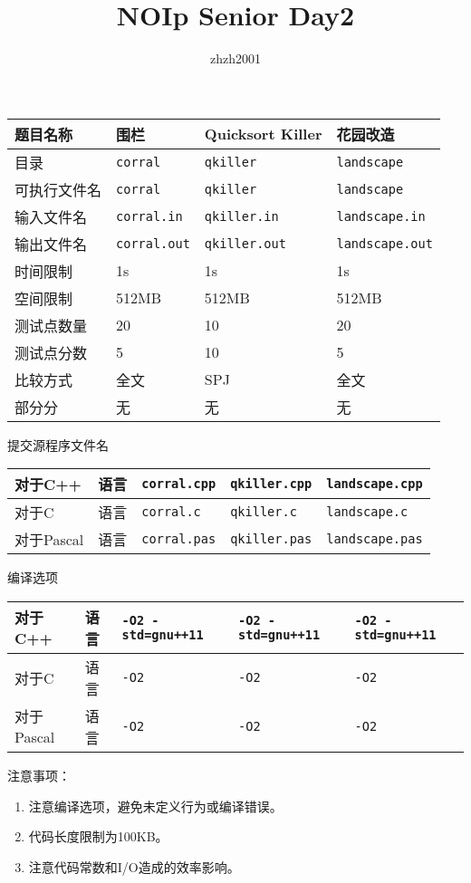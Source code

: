 \documentclass[hyperref,UTF8,12pt,a4paper]{ctexart}
\title{NOIp Senior Day2}
\author{zhzh2001}
\date{}
\begin{document}
\maketitle

\begin{center}
\begin{tabular}{|p{100pt}|p{100pt}|p{100pt}|p{100pt}|}
\hline
题目名称 & 围栏 & Quicksort Killer & 花园改造\\
\hline
目录 & \verb|corral| & \verb|qkiller| & \verb|landscape|\\
\hline
可执行文件名 & \verb|corral| & \verb|qkiller| & \verb|landscape|\\
\hline
输入文件名 & \verb|corral.in| & \verb|qkiller.in| & \verb|landscape.in|\\
\hline
输出文件名 & \verb|corral.out| & \verb|qkiller.out| & \verb|landscape.out|\\
\hline
时间限制 & 1s & 1s & 1s\\
\hline
空间限制 & 512MB & 512MB & 512MB\\
\hline
测试点数量 & 20 & 10 & 20\\
\hline
测试点分数 & 5 & 10 & 5\\
\hline
比较方式 & 全文 & SPJ & 全文\\
\hline
部分分 & 无 & 无 & 无\\
\hline
\end{tabular}
\end{center}
提交源程序文件名
\begin{center}
\begin{tabular}{|p{60pt}p{28pt}|p{100pt}|p{100pt}|p{100pt}|}
\hline
对于C++ & 语言 & \verb|corral.cpp|& \verb|qkiller.cpp| & \verb|landscape.cpp| \\
\hline
对于C & 语言 & \verb|corral.c| & \verb|qkiller.c| & \verb|landscape.c|\\
\hline
对于Pascal & 语言 & \verb|corral.pas|& \verb|qkiller.pas| & \verb|landscape.pas|\\
\hline
\end{tabular}
\end{center}
编译选项
\begin{center}
\begin{tabular}{|p{60pt}p{28pt}|p{100pt}|p{100pt}|p{100pt}|}
\hline
对于C++ & 语言 & \verb|-O2 -std=gnu++11| & \verb|-O2 -std=gnu++11| & \verb|-O2 -std=gnu++11|\\
\hline
对于C & 语言 & \verb|-O2| & \verb|-O2| & \verb|-O2|\\
\hline
对于Pascal & 语言 & \verb|-O2| & \verb|-O2| & \verb|-O2|\\
\hline
\end{tabular}
\end{center}
注意事项：
\begin{enumerate}
\item 注意编译选项，避免未定义行为或编译错误。
\item 代码长度限制为100KB。
\item 注意代码常数和I/O造成的效率影响。
\end{enumerate}
\end{document}
